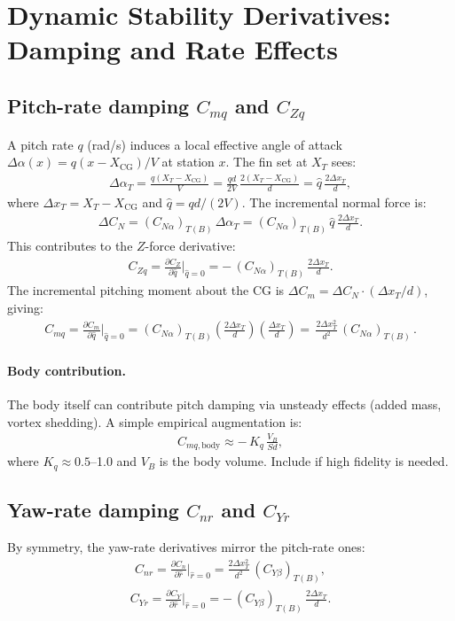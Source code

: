 \documentclass[11pt]{article}
\begin{document}
\section{Dynamic Stability Derivatives: Damping and Rate Effects}

\subsection{Pitch-rate damping $C_{mq}$ and $C_{Zq}$}
A pitch rate $q$ (rad/s) induces a local effective angle of attack $\Delta\alpha(x) = q(x-X_{\text{CG}})/V$ at station $x$. The fin set at $X_T$ sees:
\begin{align}
\Delta\alpha_T = \frac{q(X_T-X_{\text{CG}})}{V} = \frac{qd}{2V}\,\frac{2(X_T-X_{\text{CG}})}{d}
= \hat q\,\frac{2\Delta x_T}{d},
\end{align}
where $\Delta x_T = X_T-X_{\text{CG}}$ and $\hat q = qd/(2V)$. The incremental normal force is:
\begin{align}
\Delta C_N = (C_{N\alpha})_{T(B)}\,\Delta\alpha_T = (C_{N\alpha})_{T(B)}\,\hat q\,\frac{2\Delta x_T}{d}.
\end{align}
This contributes to the $Z$-force derivative:
\begin{align}
\label{eq:CZq}
C_{Zq} = \frac{\partial C_Z}{\partial \hat q}\bigg|_{\hat q=0} = -\,(C_{N\alpha})_{T(B)}\,\frac{2\Delta x_T}{d}.
\end{align}
The incremental pitching moment about the CG is $\Delta C_m = \Delta C_N \cdot (\Delta x_T/d)$, giving:
\begin{align}
\label{eq:Cmq}
C_{mq} = \frac{\partial C_m}{\partial \hat q}\bigg|_{\hat q=0}
= (C_{N\alpha})_{T(B)}\left(\frac{2\Delta x_T}{d}\right)\left(\frac{\Delta x_T}{d}\right)
= \boxed{\,\frac{2\Delta x_T^2}{d^2}\,(C_{N\alpha})_{T(B)}\,}.
\end{align}

\paragraph{Body contribution.} The body itself can contribute pitch damping via unsteady effects (added mass, vortex shedding). A simple empirical augmentation is:
\begin{align}
C_{mq,\text{body}} \approx -\,K_q\,\frac{V_B}{Sd},
\end{align}
where $K_q\approx 0.5$--1.0 and $V_B$ is the body volume. Include if high fidelity is needed.

\subsection{Yaw-rate damping $C_{nr}$ and $C_{Yr}$}
By symmetry, the yaw-rate derivatives mirror the pitch-rate ones:
\begin{align}
\label{eq:Cnr}
C_{nr} = \frac{\partial C_n}{\partial \hat r}\bigg|_{\hat r=0}
= \frac{2\Delta x_T^2}{d^2}\,(C_{Y\beta})_{T(B)},
\end{align}
\begin{align}
\label{eq:CYr}
C_{Yr} = \frac{\partial C_Y}{\partial \hat r}\bigg|_{\hat r=0}
= -\,(C_{Y\beta})_{T(B)}\,\frac{2\Delta x_T}{d}.
\end{align}
\end{document}

